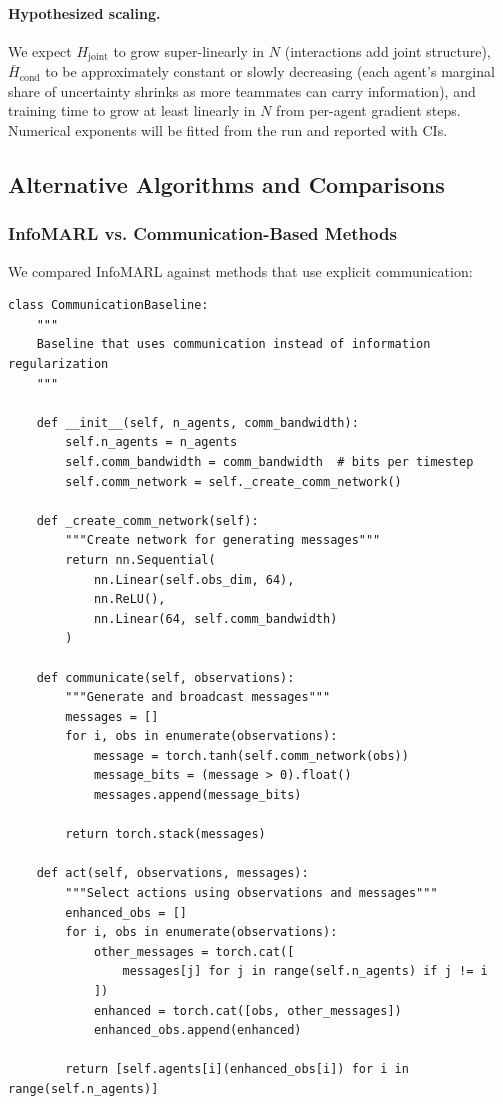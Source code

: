 \documentclass[10pt, letterpaper]{article}
\begin{document}
\paragraph{Hypothesized scaling.} We expect $H_\text{joint}$ to grow super-linearly in $N$ (interactions add joint structure), $\bar{H}_\text{cond}$ to be approximately constant or slowly decreasing (each agent's marginal share of uncertainty shrinks as more teammates can carry information), and training time to grow at least linearly in $N$ from per-agent gradient steps. Numerical exponents will be fitted from the run and reported with CIs.

\subsection{Alternative Algorithms and Comparisons}

\subsubsection{InfoMARL vs. Communication-Based Methods}

We compared InfoMARL against methods that use explicit communication:

\begin{lstlisting}
class CommunicationBaseline:
    """
    Baseline that uses communication instead of information regularization
    """

    def __init__(self, n_agents, comm_bandwidth):
        self.n_agents = n_agents
        self.comm_bandwidth = comm_bandwidth  # bits per timestep
        self.comm_network = self._create_comm_network()

    def _create_comm_network(self):
        """Create network for generating messages"""
        return nn.Sequential(
            nn.Linear(self.obs_dim, 64),
            nn.ReLU(),
            nn.Linear(64, self.comm_bandwidth)
        )

    def communicate(self, observations):
        """Generate and broadcast messages"""
        messages = []
        for i, obs in enumerate(observations):
            message = torch.tanh(self.comm_network(obs))
            message_bits = (message > 0).float()
            messages.append(message_bits)

        return torch.stack(messages)

    def act(self, observations, messages):
        """Select actions using observations and messages"""
        enhanced_obs = []
        for i, obs in enumerate(observations):
            other_messages = torch.cat([
                messages[j] for j in range(self.n_agents) if j != i
            ])
            enhanced = torch.cat([obs, other_messages])
            enhanced_obs.append(enhanced)

        return [self.agents[i](enhanced_obs[i]) for i in range(self.n_agents)]
\end{lstlisting}
\end{document}
